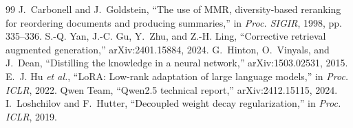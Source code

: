 \documentclass[conference,a4paper]{IEEEtran}
\begin{document}
\begin{thebibliography}{99}
 J.~Carbonell and J.~Goldstein, ``The use of MMR, diversity-based reranking for reordering documents and producing summaries,'' in \emph{Proc. SIGIR}, 1998, pp. 335--336.
 S.-Q. Yan, J.-C. Gu, Y.~Zhu, and Z.-H. Ling, ``Corrective retrieval augmented generation,'' arXiv:2401.15884, 2024.
 G.~Hinton, O.~Vinyals, and J.~Dean, ``Distilling the knowledge in a neural network,'' arXiv:1503.02531, 2015.
 E.~J. Hu \emph{et al.}, ``LoRA: Low-rank adaptation of large language models,'' in \emph{Proc. ICLR}, 2022.
 Qwen Team, ``Qwen2.5 technical report,'' arXiv:2412.15115, 2024.
 I.~Loshchilov and F.~Hutter, ``Decoupled weight decay regularization,'' in \emph{Proc. ICLR}, 2019.
\end{thebibliography}
\end{document}
